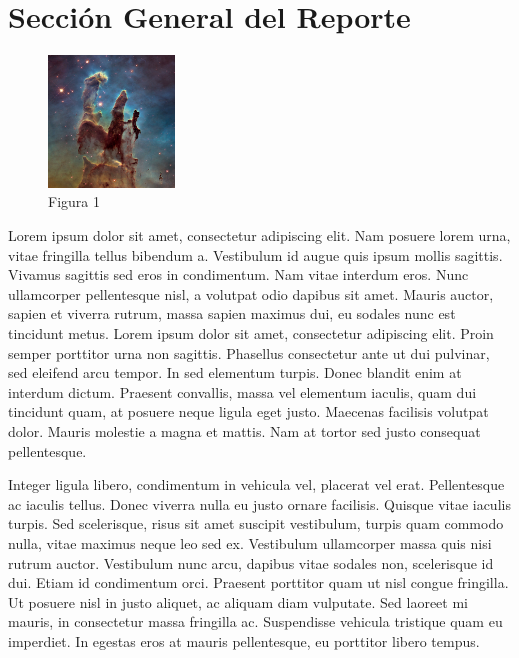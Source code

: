 \documentclass[12pt]{article}                               %
\begin{document}
\section{Sección General del Reporte}



\begin{figure}
    \centering
    \includegraphics[width=0.30\textwidth]{PilaresCreacion.jpg}
    \caption{Figura 1}
\end{figure}
 

Lorem ipsum dolor sit amet, consectetur adipiscing elit. Nam posuere lorem urna, vitae fringilla tellus bibendum a. Vestibulum id augue quis ipsum mollis sagittis. Vivamus sagittis sed eros in condimentum. Nam vitae interdum eros. Nunc ullamcorper pellentesque nisl, a volutpat odio dapibus sit amet. Mauris auctor, sapien et viverra rutrum, massa sapien maximus dui, eu sodales nunc est tincidunt metus. Lorem ipsum dolor sit amet, consectetur adipiscing elit. Proin semper porttitor urna non sagittis. Phasellus consectetur ante ut dui pulvinar, sed eleifend arcu tempor. In sed elementum turpis. Donec blandit enim at interdum dictum. Praesent convallis, massa vel elementum iaculis, quam dui tincidunt quam, at posuere neque ligula eget justo. Maecenas facilisis volutpat dolor. Mauris molestie a magna et mattis. Nam at tortor sed justo consequat pellentesque.

Integer ligula libero, condimentum in vehicula vel, placerat vel erat. Pellentesque ac iaculis tellus. Donec viverra nulla eu justo ornare facilisis. Quisque vitae iaculis turpis. Sed scelerisque, risus sit amet suscipit vestibulum, turpis quam commodo nulla, vitae maximus neque leo sed ex. Vestibulum ullamcorper massa quis nisi rutrum auctor. Vestibulum nunc arcu, dapibus vitae sodales non, scelerisque id dui. Etiam id condimentum orci. Praesent porttitor quam ut nisl congue fringilla. Ut posuere nisl in justo aliquet, ac aliquam diam vulputate. Sed laoreet mi mauris, in consectetur massa fringilla ac. Suspendisse vehicula tristique quam eu imperdiet. In egestas eros at mauris pellentesque, eu porttitor libero tempus.
\end{document}
